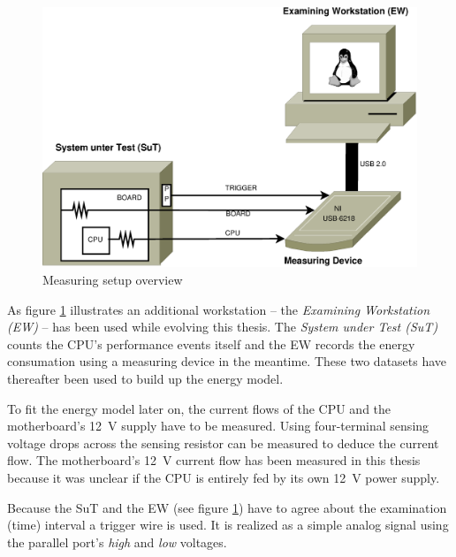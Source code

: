 \label{sec:design}


\label{sec:big-pic}

\begin{figure}
  \centering
    \includegraphics[width=\textwidth]{fig/measuring-overview.eps}
  \caption{Measuring setup overview}
  \label{fig:overview}
\end{figure}

As figure \ref{fig:overview} illustrates an additional workstation -- the
\emph{Examining Workstation (EW)} -- has been used while evolving this thesis.
The \emph{System under Test (SuT)} counts the CPU's performance events itself
and the EW records the energy consumation using a measuring device in the
meantime. These two datasets have thereafter been used to build up the energy
model.


\label{sec:measuring-setup}

To fit the energy model later on, the current flows of the CPU and the
motherboard's \SI{12}{\volt} supply have to be measured. Using four-terminal
sensing \cite{wiki:FTS} voltage drops across the sensing resistor can be
measured to deduce the current flow. The motherboard's \SI{12}{\volt} current
flow has been measured in this thesis because it was unclear if the CPU is
entirely fed by its own \SI{12}{\volt} power supply.

Because the SuT and the EW (see figure \ref{fig:overview}) have to agree about
the examination (time) interval a trigger wire is used. It is realized as a
simple analog signal using the parallel port's \emph{high} and \emph{low}
voltages.

